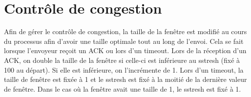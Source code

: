 \documentclass{article}
\begin{document}
\section{Contrôle de congestion}

Afin de gérer le contrôle de congestion, la taille de la fenêtre est modifié au cours du processus afin d'avoir une taille optimale tout au long de l'envoi.
Cela se fait lorsque l'envoyeur reçoit un ACK ou lors d'un timeout.
Lors de la réception d'un ACK, on double la taille de la fenêtre si celle-ci est inférieure au sstresh (fixé à 100 au départ). Si elle est inférieure, on l'incrémente de 1.
Lors d'un timeout, la taille de fenêtre est fixée à 1 et le sstresh est fixé à la moitié de la dernière valeur de fenêtre. Dans le cas où la fenêtre avait une taille de 1, le sstresh est fixé à 1.
\end{document}
